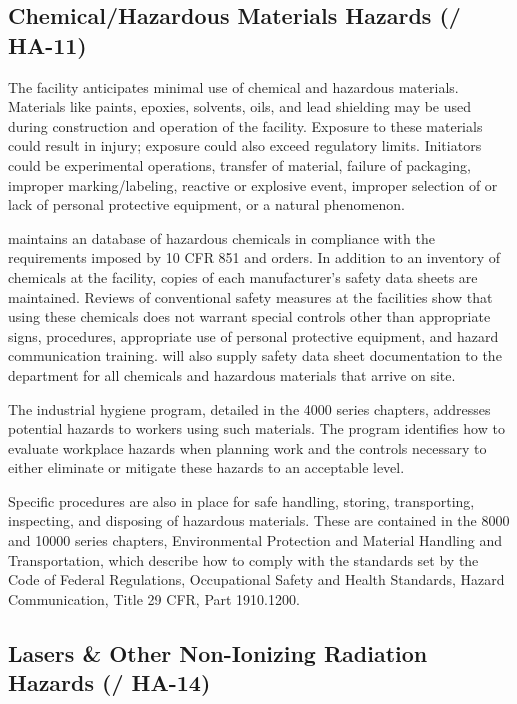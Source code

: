 \subsection{Chemical/Hazardous Materials Hazards (/ HA-11)}

The  facility anticipates minimal use of chemical and hazardous
materials. Materials like paints, epoxies, solvents, oils, and lead
shielding may be used during construction and operation of the
facility. Exposure to these materials could result in injury; 
exposure could also exceed regulatory limits. Initiators could be
experimental operations, transfer of material, failure of packaging,
improper marking/labeling, reactive or explosive event, improper
selection of or lack of personal protective equipment, or a
natural phenomenon.

\fnal maintains an database of hazardous chemicals in compliance with
the requirements imposed by 10 CFR 851 and  orders. In
addition to an inventory of chemicals at the facility, copies of each
manufacturer's safety data sheets are maintained. Reviews of
conventional safety measures at the facilities show that using these
chemicals does not warrant special controls other than appropriate
signs, procedures, appropriate use of personal protective equipment,
and hazard communication training.  will also supply
safety data sheet documentation to the  
department for all chemicals and hazardous materials that arrive on
site.

The industrial hygiene program, detailed in the  4000
series chapters, addresses potential hazards to workers using such
materials. The program identifies how to evaluate workplace hazards
when planning work and the controls necessary to either eliminate or
mitigate these hazards to an acceptable level.

Specific procedures are also in place for safe handling, storing,
transporting, inspecting, and disposing of hazardous materials. These
are contained in the  8000 and 10000 series chapters,
Environmental Protection and Material Handling and Transportation,
which describe how to comply with the standards set by the Code of
Federal Regulations, Occupational Safety and Health Standards, Hazard
Communication, Title 29 CFR, Part 1910.1200.


\subsection{Lasers \& Other Non-Ionizing Radiation Hazards (/ HA-14)}

